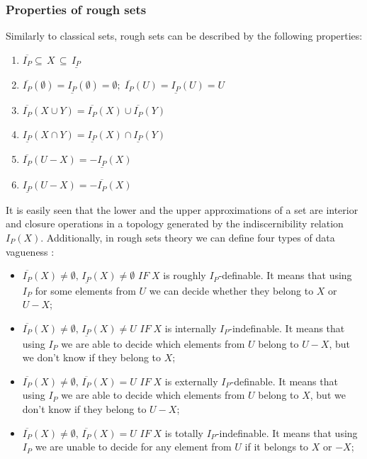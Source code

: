 \subsubsection{Properties of rough sets}
Similarly to classical sets, rough sets can be described by the
following properties:
\begin{enumerate}
    \item $\overline{I_P} \subseteq \, X \, \subseteq \, \underline{I_P}$
    \item $\overline{I_P}(\emptyset) = \underline{I_P}(\emptyset) = \emptyset;
        \; \overline{I_P}(U) = \underline{I_P}(U) = U $
    \item $\overline{I_P}(X \cup Y) = \overline{I_P}(X) \cup \overline{I_P}(Y)$
    \item $\underline{I_P}(X \cap Y) = \underline{I_P}(X) \cap \underline{I_P}(Y)$
    \item $\overline{I_P}(U-X) = -\underline{I_P}(X)$
    \item $\underline{I_P}(U-X) = -\overline{I_P}(X)$
\end{enumerate}
It is easily seen that the lower and the upper 
approximations of a set are interior and 
closure operations in a topology generated by the 
indiscernibility relation $I_P(X)$. Additionally, in rough sets theory 
we can define four types of data vagueness \cite{bib40}:
\begin{itemize}
    \item $\overline{I_P}(X) \neq \emptyset,\, \underline{I_P}(X) \neq
        \emptyset$ $IF\; X$ is roughly $I_P$-definable. It means that using $I_P$ for some
        elements from $U$ we can decide whether they belong to $X$ or $U-X$;
        
    \item $\overline{I_P}(X) \neq \emptyset,\, \underline{I_P}(X) \neq U$ $IF\;
        X$ is internally $I_P$-indefinable. It means that using $I_P$ we are able to decide
        which elements from $U$ belong to $U-X$, but we don't know if they
        belong to $X$;
    \item $\overline{I_P}(X) \neq \emptyset,\, \overline{I_P}(X) = U$ $IF\;
        X$ is externally $I_P$-definable. It means that using $I_P$ we are able to decide
        which elements from $U$ belong to $X$, but we don't know if they belong
        to $U-X$;
    \item $\overline{I_P}(X) \neq \emptyset,\, \overline{I_P}(X) = U$ $IF\;
        X$ is totally $I_P$-indefinable. It means that using $I_P$ we are unable to decide
        for any element from $U$ if it belongs to $X$ or $-X$;
\end{itemize}
